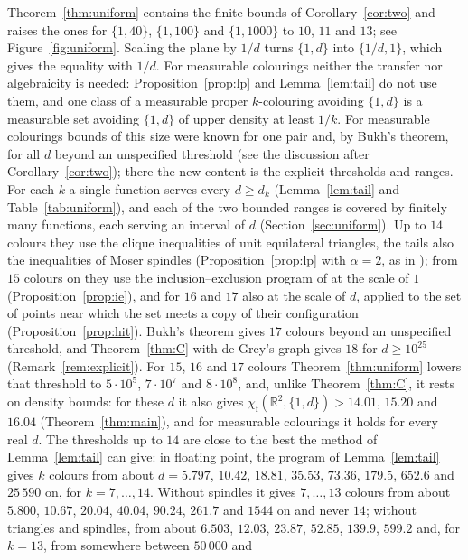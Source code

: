 \documentclass[11pt,a4paper]{amsart}
\theoremstyle{definition}
\theoremstyle{remark}
\newcommand{\R}{\mathbb{R}}
\newcommand{\chif}{\chi_{\mathrm f}}
\begin{document}
Theorem~\ref{thm:uniform} contains the finite bounds of Corollary~\ref{cor:two} and raises the ones for $\{1,40\}$,
$\{1,100\}$ and $\{1,1000\}$ to $10$, $11$ and $13$; see Figure~\ref{fig:uniform}. Scaling the plane by $1/d$ turns $\{1,d\}$ into $\{1/d,1\}$,
which gives the equality with $1/d$. For measurable colourings neither the transfer nor algebraicity is needed:
Proposition~\ref{prop:lp} and Lemma~\ref{lem:tail} do not use them, and one class of a measurable proper $k$-colouring
avoiding $\{1,d\}$ is a measurable set avoiding $\{1,d\}$ of upper density at least $1/k$. For measurable colourings
bounds of this size were known for one pair \cite[§4]{OFV} and, by Bukh's theorem, for all $d$ beyond an unspecified
threshold (see the discussion after Corollary~\ref{cor:two}); there the new content is the explicit thresholds and
ranges. For each $k$ a single function serves every $d\ge d_k$ (Lemma~\ref{lem:tail} and Table~\ref{tab:uniform}),
and each of the two bounded ranges is covered by finitely many functions, each serving an interval of $d$
(Section~\ref{sec:uniform}). Up to $14$ colours they use the clique inequalities of unit equilateral triangles, the
tails also the inequalities of Moser spindles (Proposition~\ref{prop:lp} with $\alpha=2$, as in \cite{KMOR}); from
$15$ colours on they use the inclusion--exclusion program of \cite{ACMVZ} at the scale of $1$
(Proposition~\ref{prop:ie}), and for $16$ and $17$ also at the scale of $d$, applied to the set of points near which
the set meets a copy of their configuration (Proposition~\ref{prop:hit}). Bukh's theorem gives $17$ colours beyond an
unspecified threshold, and Theorem~\ref{thm:C} with de Grey's graph gives $18$ for $d\ge10^{25}$
(Remark~\ref{rem:explicit}). For $15$, $16$ and $17$ colours Theorem~\ref{thm:uniform} lowers that threshold to
$5\cdot10^5$, $7\cdot10^7$ and $8\cdot10^8$, and, unlike Theorem~\ref{thm:C}, it rests on density bounds: for these
$d$ it also gives $\chif(\R^2,\{1,d\})>14.01$, $15.20$ and $16.04$ (Theorem~\ref{thm:main}), and for measurable
colourings it holds for every real $d$. The thresholds up to $14$
are close to the best the method of Lemma~\ref{lem:tail} can give: in floating point, the program of Lemma~\ref{lem:tail} gives $k$ colours
from about $d=5.797$, $10.42$, $18.81$, $35.53$, $73.36$, $179.5$, $652.6$ and $25\,590$ on, for $k=7,\dots,14$. Without spindles it gives $7,\dots,13$ colours from about $5.800$,
$10.67$, $20.04$, $40.04$, $90.24$, $261.7$ and $1544$ on and never $14$; without triangles and spindles, from about
$6.503$, $12.03$, $23.87$, $52.85$, $139.9$, $599.2$ and, for $k=13$, from somewhere between $50\,000$ and
\end{document}
